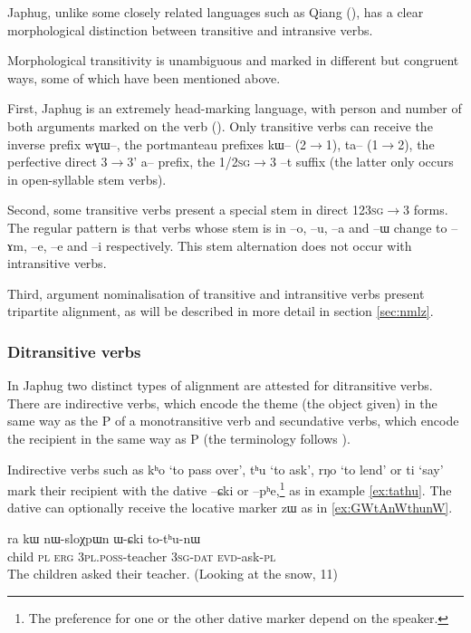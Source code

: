 \documentclass[oldfontcommands,oneside,a4paper,11pt]{article}
\newcommand{\ipa}[1]{{\phon #1}} %
\begin{document}
Japhug, unlike some closely related languages such as Qiang (\citealt{lapolla11transitivity}), has a clear morphological distinction between transitive and intransive verbs. 

  Morphological transitivity is unambiguous and  marked in   different but congruent  ways, some of which have been mentioned above.

First,  Japhug  is an extremely head-marking language, with person and number of both arguments marked on the verb (\citealt{jacques10inverse}). Only transitive verbs can receive the inverse prefix \ipa{wɣɯ}--, the portmanteau prefixes \ipa{kɯ}-- (2$\rightarrow$1), \ipa{ta}-- (1$\rightarrow$2), the perfective direct 3$\rightarrow$3'  \ipa{a}-- prefix,  the 1/\textsc{2sg}$\rightarrow$3 --\ipa{t} suffix (the latter only occurs in open-syllable stem verbs).


Second,    some transitive verbs present a special stem in direct \textsc{123sg}$\rightarrow$3 forms. The regular pattern is that verbs whose stem is in --\ipa{o}, --\ipa{u}, --\ipa{a} and --\ipa{ɯ} change to --\ipa{ɤm}, --\ipa{e}, --\ipa{e} and --\ipa{i} respectively. This stem alternation does not occur with intransitive verbs.

Third, argument nominalisation of transitive   and intransitive  verbs present tripartite alignment, as will be described in more detail in section  \ref{sec:nmlz}.

\subsubsection{Ditransitive verbs} \label{sec:bitr}
 In Japhug two distinct types of alignment are attested for ditransitive verbs. There are indirective verbs, which encode the theme (the object given) in the same way as the P of a monotransitive verb and secundative verbs, which encode the recipient in the same way as P (the terminology follows \citealt{malchukov10ditransitive}).

Indirective verbs such as \ipa{kʰo} `to pass over', \ipa{tʰu} `to ask', \ipa{rŋo} `to lend' or \ipa{ti} `say' mark their recipient with the dative \ipa{--ɕki} or \ipa{--pʰe},\footnote{The preference for one or the other dative marker depend on the speaker.} as in example \ref{ex:tathu}. The dative can optionally receive the locative marker \ipa{zɯ} as in \ref{ex:GWtAnWthunW}.
 \begin{exe}
   \ex   \label{ex:tathu}
 \gll \ipa{tɤpɤtso}  	\ipa{ra}  	\ipa{kɯ}  	\ipa{nɯ-sloχpɯn}  	\ipa{ɯ-ɕki}  	\ipa{to-tʰu-nɯ}  \\
child \textsc{pl} \textsc{erg} \textsc{3pl.poss}-teacher \textsc{3sg-dat} \textsc{evd}-ask-\textsc{pl} \\
\glt The children asked their teacher. (Looking at the snow, 11)
   \end{exe}  
\end{document}
